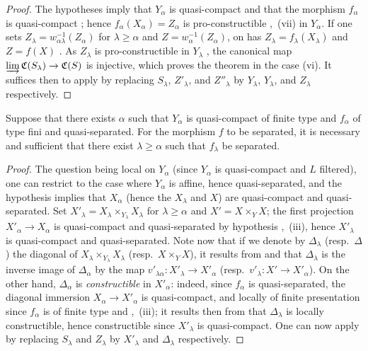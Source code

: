\begin{proof}
The hypotheses imply that $Y_\alpha$ is quasi-compact and that the morphism $f_\alpha$ is quasi-compact ; hence $f_\alpha(X_\alpha)=Z_\alpha$ is pro-constructible ,~(vii) in $Y_\alpha$.
If one sets $Z_\lambda=w_{\alpha\lambda}^{-1}(Z_\alpha)$ for $\lambda\geqslant\alpha$ and $Z=w_\alpha^{-1}(Z_\alpha)$, on has $Z_\lambda=f_\lambda(X_\lambda)$ and $Z=f(X)$ .
As $Z_\lambda$ is pro-constructible in $Y_\lambda$ , the canonical map $\varinjlim\mathfrak{C}(S_\lambda)\to\mathfrak{C}(S)$ is injective, which proves the theorem in the case (vi).
It suffices then to apply  by replacing $S_\lambda$, $Z'_\lambda$, and $Z''_\lambda$ by $Y_\lambda$, $Y_\lambda$, and $Z_\lambda$ respectively.
\end{proof}

\begin{proposition}[8.10.4]
\label{IV.8.10.4}
Suppose that there exists $\alpha$ such that $Y_\alpha$ is quasi-compact of finite type and $f_\alpha$ of type fini and quasi-separated.
For the morphism $f$ to be separated, it is necessary and sufficient that there exist $\lambda\geqslant\alpha$ such that $f_\lambda$ be separated.
\end{proposition}

\begin{proof}
The question being local on $Y_\alpha$ (since $Y_\alpha$ is quasi-compact and $L$ filtered), one can restrict to the case where $Y_\alpha$ is affine, hence quasi-separated, and the hypothesis implies that $X_\alpha$ (hence the $X_\lambda$ and $X$) are quasi-compact and quasi-separated.
Set $X'_\lambda=X_\lambda\times_{Y_\lambda}X_\lambda$ for $\lambda\geqslant\alpha$ and $X'=X\times_Y X$; the first projection $X'_\alpha\to X_\alpha$ is quasi-compact and quasi-separated by hypothesis ,~(iii), hence $X'_\lambda$ is quasi-compact and quasi-separated.
Note now that if we denote by $\Delta_\lambda$ (resp.\ $\Delta$) the diagonal of $X_\lambda\times_{Y_\lambda}X_\lambda$ (resp.\ $X\times_Y X$), it results from  and  that $\Delta_\lambda$ is the inverse image of $\Delta_\alpha$ by the map $v'_{\lambda\alpha}:X'_\lambda\to X'_\alpha$ (resp.\ $v'_\lambda:X'\to X'_\alpha$).
On the other hand, $\Delta_\alpha$ is \emph{constructible} in $X'_\alpha$: indeed, since $f_\alpha$ is quasi-separated, the diagonal immersion $X_\alpha\to X'_\alpha$ is quasi-compact, and locally of finite presentation since $f_\alpha$ is of finite type  and ,~(iii); it results then from  that $\Delta_\lambda$ is locally constructible, hence constructible since $X'_\lambda$ is quasi-compact.
One can now apply  by replacing $S_\lambda$ and $Z_\lambda$ by $X'_\lambda$ and $\Delta_\lambda$ respectively.
\end{proof}

